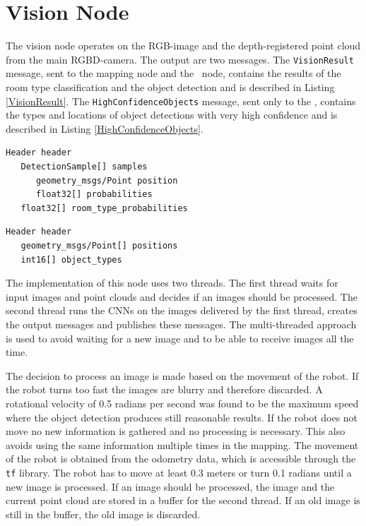 \section{Vision Node}

The vision node operates on the RGB-image and the depth-registered point cloud from the main RGBD-camera. The output are two messages. The \texttt{VisionResult} message, sent to the mapping node and the \llplanner\ node, contains the results of the room type classification and the object detection and is described in Listing \ref{VisionResult}. The \texttt{HighConfidenceObjects} message, sent only to the \llplanner, contains the types and locations of object detections with very high confidence and is described in Listing \ref{HighConfidenceObjects}. 

\begin{minipage}{\linewidth}
\begin{lstlisting}[caption=\texttt{vision/VisionResult},frame=single, label=VisionResult]
   Header header
   DetectionSample[] samples
      geometry_msgs/Point position
      float32[] probabilities 
   float32[] room_type_probabilities
\end{lstlisting}
\end{minipage}

\begin{minipage}{\linewidth}
\begin{lstlisting}[caption=\texttt{vision/HighConfidenceObjects},frame=single,label=HighConfidenceObjects]
   Header header
   geometry_msgs/Point[] positions
   int16[] object_types
\end{lstlisting} 
\end{minipage}

The implementation of this node uses two threads. The first thread waits for input images and point clouds and decides if an images should be processed. The second thread runs the CNNs on the images delivered by the first thread, creates the output messages and publishes these messages. The multi-threaded approach is used to avoid waiting for a new image and to be able to receive images all the time. 

The decision to process an image is made based on the movement of the robot. If the robot turns too fast the images are blurry and therefore discarded. A rotational velocity of 0.5 radians per second was found to be the maximum speed where the object detection produces still reasonable results. If the robot does not move no new information is gathered and no processing is necessary. This also avoids using the same information multiple times in the mapping. The movement of the robot is obtained from the odometry data, which is accessible through the \texttt{tf} library. The robot has to move at least 0.3 meters or turn 0.1 radians until a new image is processed. If an image should be processed, the image and the current point cloud are stored in a buffer for the second thread. If an old image is still in the buffer, the old image is discarded. 

